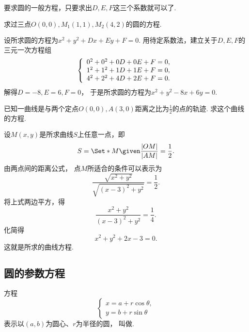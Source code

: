 要求圆的一般方程，只要求出\(D,E,F\)这三个系数就可以了.

\begin{example}
求过三点\(O(0,0),M_1(1,1),M_2(4,2)\)的圆的方程.
\begin{solution}
设所求圆的方程为\(x^2 + y^2 + D x + E y + F = 0\).
用待定系数法，建立关于\(D,E,F\)的三元一次方程组\begin{equation*}
	\def\PtEqx#1#2{#1^2 + #2^2 + #1 D + #2 E + F = 0}
	\left\{ \begin{array}{l}
		\PtEqx{0}{0}, \\
		\PtEqx{1}{1}, \\
		\PtEqx{4}{2}.
	\end{array} \right.
\end{equation*}
解得\(D = -8, E = 6, F = 0\)，
于是所求圆的方程为\(x^2 + y^2 - 8x + 6y = 0\).
\end{solution}
\end{example}

\begin{example}
已知一曲线是与两个定点\(O(0,0),A(3,0)\)距离之比为\(\frac12\)的点的轨迹.
求这个曲线的方程.
\begin{solution}
设\(M(x,y)\)是所求曲线\(S\)上任意一点，即\begin{equation*}
	S = \Set*{
		M
		\given
		\frac{\LineSegmentLength{OM}}{\LineSegmentLength{AM}} = \frac12
	}.
\end{equation*}
由两点间的距离公式，
点\(M\)所适合的条件可以表示为\begin{equation*}
	\frac{\sqrt{x^2+y^2}}{\sqrt{(x-3)^2+y^2}} = \frac12.
\end{equation*}
将上式两边平方，得\begin{equation*}
	\frac{x^2+y^2}{(x-3)^2+y^2} = \frac14.
\end{equation*}
化简得\begin{equation*}
	x^2+y^2+2x-3=0.
\end{equation*}
这就是所求的曲线方程.
\end{solution}
\end{example}

\subsection{圆的参数方程}
方程\begin{equation}
	\left\{ \begin{array}{l}
		x = a + r \cos\theta, \\
		y = b + r \sin\theta
	\end{array} \right.
\end{equation}
表示以\((a,b)\)为圆心、\(r\)为半径的圆，
叫做.

